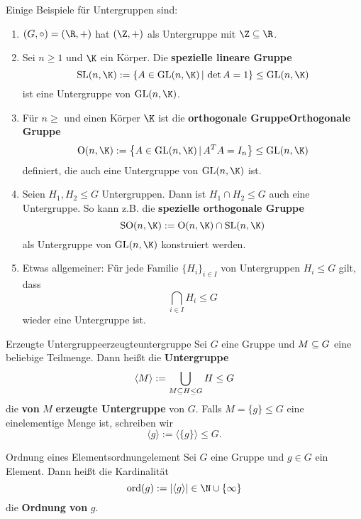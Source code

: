 \begin{beispiele}
Einige Beispiele für Untergruppen sind:
\begin{enumerate}
\item $(G, \circ) = (\R, +)$ hat $(\Z, +)$ als Untergruppe mit $\Z \sub \R$.
\item Sei $n \geq 1$ und $\K$ ein Körper. Die \textbf{spezielle lineare Gruppe}
\begin{equation}
\text{SL} (n, \K) := \left\{ A \in \text{GL}(n, \K) \, | \, \det A = 1\right\} \leq \text{GL}(n, \K)
\end{equation}
ist eine Untergruppe von $\text{GL}(n,\K)$.
\item Für $n \geq$ und einen Körper $\K$ ist die \textbf{orthogonale Gruppe}\textbf{Orthogonale Gruppe}
\begin{equation}
\text{O}(n, \K) := \left\{ A \in \text{GL}(n, \K) \, | \, A^TA = I_n \right\} \leq \text{GL}(n, \K)
\end{equation}
definiert, die auch eine Untergruppe von $\text{GL}(n, \K)$ ist.
\item Seien $H_1, H_2 \leq G$ Untergruppen. Dann ist $H_1 \cap H_2 \leq G$ auch eine Untergruppe. So kann z.B. die \textbf{spezielle orthogonale Gruppe}
\begin{equation}
\text{SO}(n, \K) := \text{O}(n, \K) \cap \text{SL}(n, \K)
\end{equation}
als Untergruppe von $\text{GL}(n, \K)$ konstruiert werden.
\item Etwas allgemeiner: Für jede Familie $\{H_i\}_{i\in I}$ von Untergruppen $H_i \leq G$ gilt, dass
\begin{equation}
\bigcap_{i \in I} H_i \leq G
\end{equation}
wieder eine Untergruppe ist.
\end{enumerate}
\end{beispiele}

\begin{definition}{Erzeugte Untergruppe}{erzeugteuntergruppe}
Sei $G$ eine Gruppe und $M \subseteq G$ eine beliebige Teilmenge. Dann heißt die \textbf{Untergruppe}
\begin{equation}
\langle M \rangle := \bigcup_{M \subseteq H \leq G} H \leq G
\end{equation}
die \textbf{von} $M$ \textbf{erzeugte Untergruppe} von $G$. Falls $M = \{g\} \leq G$ eine einelementige Menge ist, schreiben wir \begin{equation}
\langle g \rangle := \langle \{g\} \rangle \leq G.
\end{equation}
\end{definition}
\begin{definition}{Ordnung eines Elements}{ordnungelement}
Sei $G$ eine Gruppe und $g \in G$ ein Element. Dann heißt die Kardinalität 
\begin{equation}
\text{ord}(g) := | \langle g \rangle | \in \N \cup \{\infty \}
\end{equation}
die \textbf{Ordnung von} $g$.
\end{definition}

